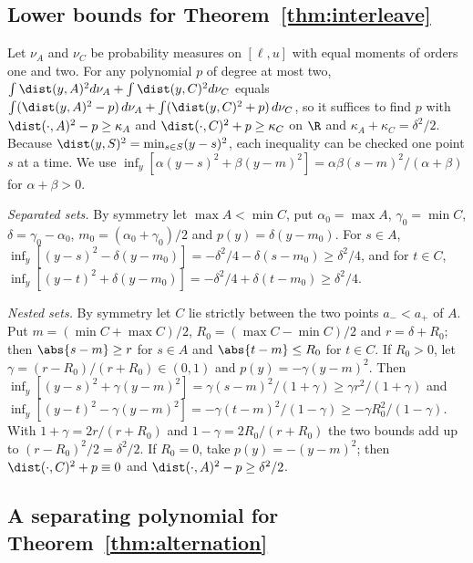 \subsection{Lower bounds for Theorem~\ref{thm:interleave}}\label{app:interleave}

Let $\nu_A$ and $\nu_C$ be probability measures on $[\ell,u]$ with equal
moments of orders one and two. For any polynomial $p$ of degree at most
two, $\int\dist(y,A)^2d\nu_A+\int\dist(y,C)^2d\nu_C$ equals
$\int(\dist(y,A)^2-p)\,d\nu_A+\int(\dist(y,C)^2+p)\,d\nu_C$, so it suffices to
find $p$ with $\dist(\cdot,A)^2-p\ge\kappa_A$ and $\dist(\cdot,C)^2+p\ge\kappa_C$
on $\R$ and $\kappa_A+\kappa_C=\delta^2/2$. Because $\dist(y,S)^2=\min_{s\in S}(y-s)^2$,
each inequality can be checked one point $s$ at a time. We use
$\inf_y[\alpha(y-s)^2+\beta(y-m)^2]=\alpha\beta(s-m)^2/(\alpha+\beta)$ for
$\alpha+\beta>0$.

\emph{Separated sets.} By symmetry let $\max A<\min C$, put $\alpha_0=\max A$,
$\gamma_0=\min C$, $\delta=\gamma_0-\alpha_0$, $m_0=(\alpha_0+\gamma_0)/2$ and
$p(y)=\delta(y-m_0)$. For $s\in A$,
$\inf_y[(y-s)^2-\delta(y-m_0)]=-\delta^2/4-\delta(s-m_0)\ge\delta^2/4$, and for
$t\in C$, $\inf_y[(y-t)^2+\delta(y-m_0)]=-\delta^2/4+\delta(t-m_0)\ge\delta^2/4$.

\emph{Nested sets.} By symmetry let $C$ lie strictly between the two
points $a_-<a_+$ of $A$. Put $m=(\min C+\max C)/2$, $R_0=(\max C-\min C)/2$
and $r=\delta+R_0$; then $\abs{s-m}\ge r$ for $s\in A$ and $\abs{t-m}\le R_0$ for
$t\in C$. If $R_0>0$, let $\gamma=(r-R_0)/(r+R_0)\in(0,1)$ and
$p(y)=-\gamma(y-m)^2$. Then
$\inf_y[(y-s)^2+\gamma(y-m)^2]=\gamma(s-m)^2/(1+\gamma)\ge\gamma r^2/(1+\gamma)$ and
$\inf_y[(y-t)^2-\gamma(y-m)^2]=-\gamma(t-m)^2/(1-\gamma)\ge-\gamma R_0^2/(1-\gamma)$.
With $1+\gamma=2r/(r+R_0)$ and $1-\gamma=2R_0/(r+R_0)$ the two bounds add up to
$(r-R_0)^2/2=\delta^2/2$. If $R_0=0$, take $p(y)=-(y-m)^2$; then
$\dist(\cdot,C)^2+p\equiv0$ and $\dist(\cdot,A)^2-p\ge\delta^2/2$.

\subsection{A separating polynomial for Theorem~\ref{thm:alternation}}\label{app:alternation}

